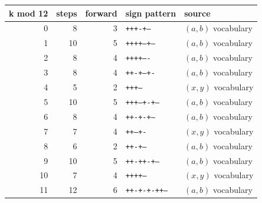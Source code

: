 \begin{tabular}{@{}rrrll@{}}\toprule k mod 12 & steps & forward & sign pattern & source\\\midrule
0 & 8 & 3 & \texttt{+++-+---} & $(a,b)$ vocabulary\\
1 & 10 & 5 & \texttt{++++---+--} & $(a,b)$ vocabulary\\
2 & 8 & 4 & \texttt{++++----} & $(a,b)$ vocabulary\\
3 & 8 & 4 & \texttt{++-+--+-} & $(a,b)$ vocabulary\\
4 & 5 & 2 & \texttt{+++--} & $(x,y)$ vocabulary\\
5 & 10 & 5 & \texttt{+++--+-+--} & $(a,b)$ vocabulary\\
6 & 8 & 4 & \texttt{++-+-+--} & $(a,b)$ vocabulary\\
7 & 7 & 4 & \texttt{++---+-} & $(x,y)$ vocabulary\\
8 & 6 & 2 & \texttt{++-+--} & $(a,b)$ vocabulary\\
9 & 10 & 5 & \texttt{++-++-+---} & $(a,b)$ vocabulary\\
10 & 7 & 4 & \texttt{++++---} & $(x,y)$ vocabulary\\
11 & 12 & 6 & \texttt{++-+-+-++---} & $(a,b)$ vocabulary\\
\bottomrule\end{tabular}
